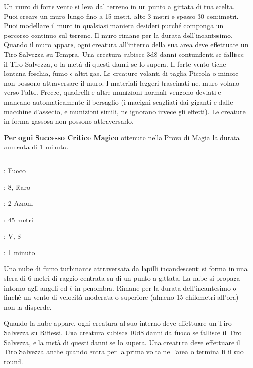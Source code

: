 \begin{multicols}{2}
Un muro di forte vento si leva dal terreno in un punto a gittata di tua scelta. Puoi creare un muro lungo fino a 15 metri, alto 3 metri e spesso 30 centimetri. Puoi modellare il muro in qualsiasi maniera desideri purché componga un percorso continuo sul terreno. Il muro rimane per la durata dell'incantesimo. Quando il muro appare, ogni creatura all'interno della sua area deve effettuare un Tiro Salvezza su Tempra. Una creatura subisce 3d8 danni contundenti se fallisce il Tiro Salvezza, o la metà di questi danni se lo supera. Il forte vento tiene lontana foschia, fumo e altri gas. Le creature volanti di taglia Piccola o minore non possono attraversare il muro. I materiali leggeri trascinati nel muro volano verso l'alto. Frecce, quadrelli e altre munizioni normali vengono deviati e mancano automaticamente il bersaglio (i macigni scagliati dai giganti e dalle macchine d'assedio, e munizioni simili, ne ignorano invece gli effetti). Le creature in forma gassosa non possono attraversarlo.

\textbf{Per ogni Successo Critico Magico} ottenuto nella Prova di Magia la durata aumenta di 1 minuto.

\smallskip\noindent\rule{\linewidth}{2pt} \hypertarget{Nube Incendiaria}{}\medskip{}
\noindent
\begin{description}[noitemsep, topsep=0pt, parsep=0pt, partopsep=0pt, leftmargin=0cm, labelwidth=2.8cm]
	\item[\textbf{Lista di Magia}]: Fuoco
	\item[\textbf{Livello}]: 8, Raro
	\item[\textbf{T. di Lancio}]: 2 Azioni
	\item[\textbf{Gittata}]: 45 metri
	\item[\textbf{Componenti}]: V, S
	\item[\textbf{Durata}]: 1 minuto
\end{description}

Una nube di fumo turbinante attraversata da lapilli incandescenti si forma in una sfera di 6 metri di raggio centrata su di un punto a gittata. La nube si propaga intorno agli angoli ed è in penombra. Rimane per la durata dell'incantesimo o finché un vento di velocità moderata o superiore (almeno 15 chilometri all'ora) non la disperde.

Quando la nube appare, ogni creatura al suo interno deve effettuare un Tiro Salvezza su Riflessi. Una creatura subisce 10d8 danni da fuoco se fallisce il Tiro Salvezza, e la metà di questi danni se lo supera. Una creatura deve effettuare il Tiro Salvezza anche quando entra per la prima volta nell'area o termina lì il suo round.


\end{multicols}
